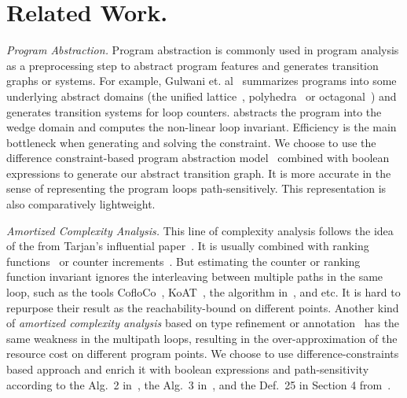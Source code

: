 \section{Related Work.}
\emph{Program Abstraction.}
Program abstraction is commonly used in program analysis as a preprocessing step to abstract program features and generates transition graphs or systems. For example, Gulwani et. al~\cite{GulwaniZ10} summarizes programs into some underlying abstract domains (the unified lattice~\cite{CousotH78}, polyhedra~\cite{CousotC77} or octagonal~\cite{Mine06})
and generates transition systems for loop counters.
\cite{KincaidCBR18} abstracts the program into the wedge domain and computes the non-linear loop invariant.
Efficiency is the main bottleneck when generating and solving the constraint.
We choose to use the difference constraint-based program abstraction model~\cite{SinnZV17,SinnZV14} combined with boolean expressions to generate our abstract transition graph.
It is more accurate in the sense of representing the program loops path-sensitively. This representation is also comparatively lightweight.

\emph{Amortized Complexity Analysis.}
This line of complexity analysis follows the idea of the
from Tarjan's influential paper~\cite{PotechinP17}. It is usually combined with ranking functions~\cite{BradleyMS05,CookSZ13,Zuleger18} or counter increments~\cite{ZulegerGSV11,SinnZV14,SinnZV17,LuCT21,AliasDFG10}.
 But estimating the counter or ranking function invariant ignores the interleaving between multiple paths in the same loop,
such as the tools CofloCo~\cite{Montoya17,Flores-MontoyaH14,Flores-Montoya16}, KoAT~\cite{BrockschmidtEFFG16,BrockschmidtEFFG14,FalkeKS12,FalkeKS11}, the algorithm in~\cite{LuCT21}, and etc.
It is hard to repurpose their result as the reachability-bound on different points.
Another kind of \emph{amortized complexity analysis} based on type refinement or annotation~\cite{CraryW00,JostHLH10,CicekBG0H17,RajaniG0021,CarbonneauxHS15} has the same weakness in the multipath loops, resulting in the over-approximation of the resource cost on different program points.
We choose to use difference-constraints based approach and enrich it with boolean expressions and path-sensitivity according to the Alg.~2 in~\cite{SinnZV14},
the Alg.~3 in~\cite{ZulegerGSV11},
and the Def.~25 in Section 4 from~\cite{SinnZV17}.

